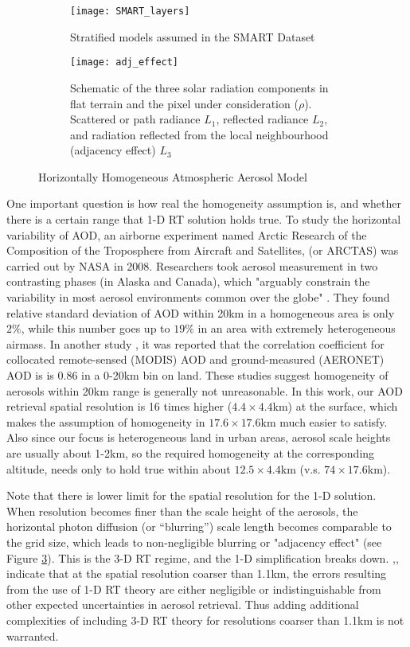 \begin{figure}[h!]
    \centering
    \begin{subfigure}{.45\textwidth}
        \centering
        \texttt{[image: SMART\_layers]}
        \caption{Stratified models assumed in the SMART Dataset}
        \label{fig:SMART_layers}
    \end{subfigure}
    \begin{subfigure}{.45\textwidth}
        \centering
        \texttt{[image: adj\_effect]}
        \caption{Schematic of the three solar radiation components in flat terrain and the pixel under consideration ($\rho$). Scattered or path radiance $L_1$, reflected radiance $L_2$, and radiation reflected from the local neighbourhood (adjacency effect) $L_3$}
        \label{fig:adj_effect}
    \end{subfigure}
    \caption{Horizontally Homogeneous Atmospheric Aerosol Model}
\end{figure}

One important question is how real the homogeneity assumption is, and whether there is a certain range that 1-D RT solution holds true. To study the horizontal variability of AOD, an airborne experiment named Arctic Research of the Composition of the Troposphere from Aircraft and Satellites, (or ARCTAS) was carried out by NASA in 2008. Researchers took aerosol measurement in two contrasting phases (in Alaska and Canada), which "arguably constrain the variability in most aerosol environments common over the globe" \cite{shinozuka}. They found relative standard deviation of AOD within 20km in a homogeneous area is only $2\%$, while this number goes up to $19\%$ in an area with extremely heterogeneous airmass. In another study \cite{kovacs}, it was reported that the correlation coefficient for collocated remote-sensed (MODIS) AOD and ground-measured (AERONET) AOD is is 0.86 in a 0-20km bin on land. These studies suggest homogeneity of aerosols within 20km range is generally not unreasonable. In this work, our AOD retrieval spatial resolution is 16 times higher ($4.4\times4.4$km) at the surface, which makes the assumption of homogeneity in $17.6\times17.6$km much easier to satisfy. Also since our focus is heterogeneous land in urban areas, aerosol scale heights are usually about 1-2km, so the required homogeneity at the corresponding altitude, needs only to hold true within about $12.5\times4.4$km (v.s. $74\times17.6$km).

Note that there is lower limit for the spatial resolution for the 1-D solution. When resolution becomes finer than the scale height of the aerosols, the horizontal photon diffusion (or “blurring”) scale length becomes comparable to the grid size, which leads to non-negligible blurring or "adjacency effect" \cite{martonchik1998b} (see Figure \ref{fig:adj_effect}). This is the 3-D RT regime, and the 1-D simplification breaks down. \cite{martonchik1998b},\cite{diner1984a},\cite{diner1984b} indicate that at the spatial resolution coarser than 1.1km, the errors resulting from the use of 1-D RT theory are either negligible or indistinguishable from other expected uncertainties in aerosol retrieval. Thus adding additional complexities of including 3-D RT theory for resolutions coarser than 1.1km is not warranted.

